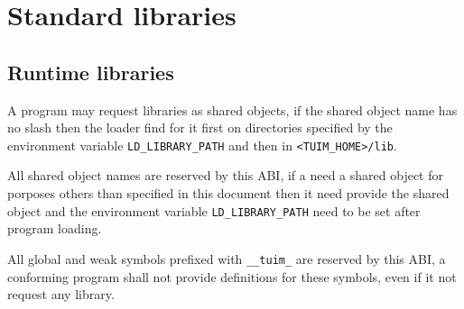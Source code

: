 \chapter{Standard libraries}
\label{cap:libraries}

\section{Runtime libraries}

A program may request libraries as shared objects,
if the shared object name has no slash then the loader find for it
first on directories specified by the environment variable
\texttt{LD\_LIBRARY\_PATH} and then in \texttt{<TUIM\_HOME>/lib}.

All shared object names are reserved by this ABI,
if a  need a shared object for porposes others than
specified in this document then it need provide the shared object and
the environment variable \texttt{LD\_LIBRARY\_PATH} need to be set
after program loading.

All global and weak symbols prefixed with \texttt{\_\_tuim\_}
are reserved by this ABI,
a conforming program shall not provide definitions for these symbols,
even if it not request any library.

